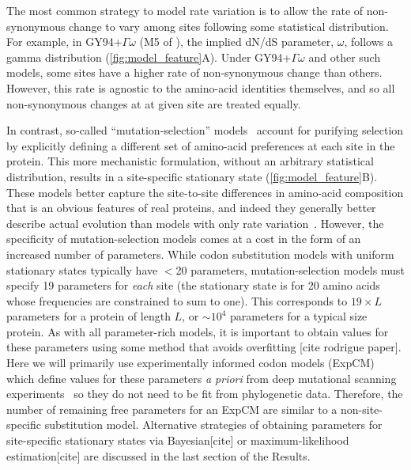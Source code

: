 \documentclass[11pt]{article}
\newcommand\skhcomment[1]{{\color{cyan}[#1]}}
\begin{document}
The most common strategy to model rate variation is to allow the rate of non-synonymous change to vary among sites following some statistical distribution.
For example, in GY94+$\Gamma\omega$ (M5 of \cite{yang2000codon}), the implied dN/dS parameter, $\omega$, follows a gamma distribution (\ref{fig:model_feature}A).
Under GY94+$\Gamma\omega$ and other such models, some sites have a higher rate of non-synonymous change than others. 
However, this rate is agnostic to the amino-acid identities themselves, and so all non-synonymous changes at at given site are treated equally. 

In contrast, so-called ``mutation-selection'' models~\citep{halpern1998evolutionary} account for purifying selection by explicitly defining a different set of amino-acid preferences at each site in the protein. 
This more mechanistic formulation, without an arbitrary statistical distribution, results in a site-specific stationary state (\ref{fig:model_feature}B). 
These models better capture the site-to-site differences in amino-acid composition that is an obvious features of real proteins, and indeed they generally better describe actual evolution than models with only rate variation~\citep{lartillot2004bayesian, le2008phylogenetic, rodrigue2010mutation,hilton2017phydms,bloom2014experimentally}.
However, the specificity of mutation-selection models comes at a cost in the form of an increased number of parameters. 
While codon substitution models with uniform stationary states typically have $<$20 parameters, mutation-selection models must specify 19 parameters for \emph{each} site (the stationary state is for 20 amino acids whose frequencies are constrained to sum to one).
This corresponds to $19\times L$ parameters for a protein of length $L$, or $\sim 10^4$ parameters for a typical size protein.
As with all parameter-rich models, it is important to obtain values for these parameters using some method that avoids overfitting \skhcomment{cite rodrigue paper}.
Here we will primarily use experimentally informed codon models (ExpCM)~\citep{bloom2014experimentally, hilton2017phydms, bloom2017identification} which define values for these parameters \textit{a priori} from deep mutational scanning experiments~\citep{araya2011,fowler2010high} so they do not need to be fit from phylogenetic data.
Therefore, the number of remaining free parameters for an ExpCM are similar to a non-site-specific substitution model.
Alternative strategies of obtaining parameters for site-specific stationary states via Bayesian\skhcomment{cite} or maximum-likelihood estimation\skhcomment{cite} are discussed in the last section of the Results.
\end{document}
